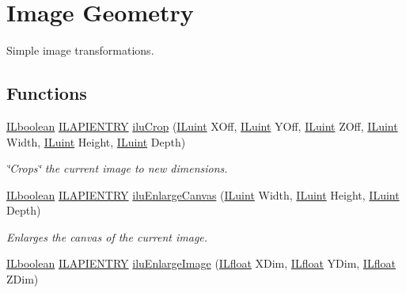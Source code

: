 \hypertarget{group__ilu__geometry}{\section{Image Geometry}
\label{group__ilu__geometry}
}


Simple image transformations.  


\subsection*{Functions}
\begin{DoxyCompactItemize}
\item 
\hyperlink{group__il__types_gaa6aa7c95cfdc06b4d8601ef832b7bb0a}{I\+Lboolean} \hyperlink{_i_l_8h_a69c08a8d06df986f7e46f209d131ef2f}{I\+L\+A\+P\+I\+E\+N\+T\+R\+Y} \hyperlink{group__ilu__geometry_ga80e4330e84ad8ec34c701e9b72c1ffed}{ilu\+Crop} (\hyperlink{group__il__types_gaff8e86a1072c8d7cfe387fb87c6ed8e1}{I\+Luint} X\+Off, \hyperlink{group__il__types_gaff8e86a1072c8d7cfe387fb87c6ed8e1}{I\+Luint} Y\+Off, \hyperlink{group__il__types_gaff8e86a1072c8d7cfe387fb87c6ed8e1}{I\+Luint} Z\+Off, \hyperlink{group__il__types_gaff8e86a1072c8d7cfe387fb87c6ed8e1}{I\+Luint} Width, \hyperlink{group__il__types_gaff8e86a1072c8d7cfe387fb87c6ed8e1}{I\+Luint} Height, \hyperlink{group__il__types_gaff8e86a1072c8d7cfe387fb87c6ed8e1}{I\+Luint} Depth)
\begin{DoxyCompactList}\small\item\em \char`\"{}\+Crops\char`\"{} the current image to new dimensions. \end{DoxyCompactList}\item 
\hyperlink{group__il__types_gaa6aa7c95cfdc06b4d8601ef832b7bb0a}{I\+Lboolean} \hyperlink{_i_l_8h_a69c08a8d06df986f7e46f209d131ef2f}{I\+L\+A\+P\+I\+E\+N\+T\+R\+Y} \hyperlink{group__ilu__geometry_gacba148d63e2e0da80b100c3ada950cb4}{ilu\+Enlarge\+Canvas} (\hyperlink{group__il__types_gaff8e86a1072c8d7cfe387fb87c6ed8e1}{I\+Luint} Width, \hyperlink{group__il__types_gaff8e86a1072c8d7cfe387fb87c6ed8e1}{I\+Luint} Height, \hyperlink{group__il__types_gaff8e86a1072c8d7cfe387fb87c6ed8e1}{I\+Luint} Depth)
\begin{DoxyCompactList}\small\item\em Enlarges the canvas of the current image. \end{DoxyCompactList}\item 
\hyperlink{group__il__types_gaa6aa7c95cfdc06b4d8601ef832b7bb0a}{I\+Lboolean} \hyperlink{_i_l_8h_a69c08a8d06df986f7e46f209d131ef2f}{I\+L\+A\+P\+I\+E\+N\+T\+R\+Y} \hyperlink{group__ilu__geometry_gaa9fe272b82b15ed2e52762e5e763b908}{ilu\+Enlarge\+Image} (\hyperlink{group__il__types_ga376156c9461893f4b1a5de9579dc86f2}{I\+Lfloat} X\+Dim, \hyperlink{group__il__types_ga376156c9461893f4b1a5de9579dc86f2}{I\+Lfloat} Y\+Dim, \hyperlink{group__il__types_ga376156c9461893f4b1a5de9579dc86f2}{I\+Lfloat} Z\+Dim)

\end{DoxyCompactItemize}
